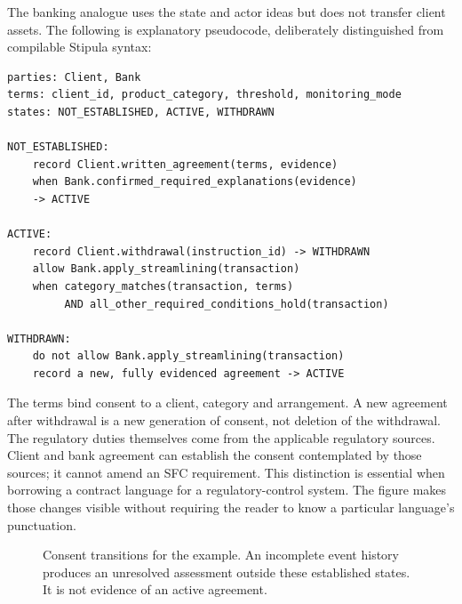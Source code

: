 The banking analogue uses the state and actor ideas but does not transfer client
assets. The following is explanatory pseudocode, deliberately distinguished
from compilable Stipula syntax:
\begin{lstlisting}[caption={A consent model inspired by Stipula. ``Record'' observes an event; ``allow'' describes the control's decision.}]
parties: Client, Bank
terms: client_id, product_category, threshold, monitoring_mode
states: NOT_ESTABLISHED, ACTIVE, WITHDRAWN

NOT_ESTABLISHED:
    record Client.written_agreement(terms, evidence)
    when Bank.confirmed_required_explanations(evidence)
    -> ACTIVE

ACTIVE:
    record Client.withdrawal(instruction_id) -> WITHDRAWN
    allow Bank.apply_streamlining(transaction)
    when category_matches(transaction, terms)
         AND all_other_required_conditions_hold(transaction)

WITHDRAWN:
    do not allow Bank.apply_streamlining(transaction)
    record a new, fully evidenced agreement -> ACTIVE
\end{lstlisting}
The terms bind consent to a client, category and arrangement. A new agreement
after withdrawal is a new generation of consent, not deletion of the withdrawal.
The regulatory duties themselves come from the applicable regulatory sources.
Client and bank agreement can establish the consent contemplated by those
sources; it cannot amend an SFC requirement. This distinction is essential when
borrowing a contract language for a regulatory-control system.
The figure makes those changes visible without requiring the reader to know a
particular language's punctuation.

\begin{figure}[htbp]
\centering
{}
\caption{Consent transitions for the example. An incomplete event history produces
an unresolved assessment outside these established states. It is not evidence
of an active agreement.}
\label{fig:consent-tutorial}
\end{figure}

